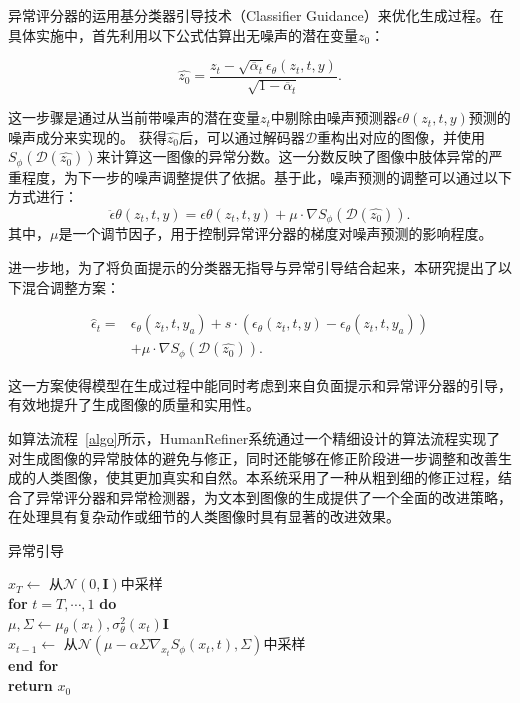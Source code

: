 异常评分器的运用基分类器引导技术（Classifier Guidance）\cite{dhariwal2021diffusion}来优化生成过程。在具体实施中，首先利用以下公式估算出无噪声的潜在变量$z_0$：

\begin{equation}
\hat{z_0} = \frac{z_t - \sqrt{\overline{\alpha}_t} \epsilon_\theta(z_t, t, y)}{\sqrt{1 - \overline{\alpha}_t}}.
\end{equation}

这一步骤是通过从当前带噪声的潜在变量$z_t$中剔除由噪声预测器$\epsilon\theta(z_t, t, y)$预测的噪声成分来实现的。
获得$\hat{z_0}$后，可以通过解码器$\mathcal{D}$重构出对应的图像，并使用$S_\phi(\mathcal{D}(\hat{z_0}))$来计算这一图像的异常分数。这一分数反映了图像中肢体异常的严重程度，为下一步的噪声调整提供了依据。基于此，噪声预测的调整可以通过以下方式进行：
\begin{equation}
\ddot{\epsilon}\theta (z_t, t, y) = \epsilon\theta(z_t, t, y) + \mu \cdot \nabla S_\phi(\mathcal{D}(\hat{z_0})).
\end{equation}
其中，$\mu$是一个调节因子，用于控制异常评分器的梯度对噪声预测的影响程度。


进一步地，为了将负面提示的分类器无指导与异常引导结合起来，本研究提出了以下混合调整方案：

\begin{equation}
\begin{split}
    \hat{\epsilon}_t = & \epsilon_\theta(z_t, t, y_a) + s \cdot (\epsilon_\theta(z_t, t, y) - \epsilon_\theta(z_t , t, y_a)) \\
& + \mu \cdot \nabla S_\phi(\mathcal{D}(\hat{z_0})).  
\end{split}  
\end{equation}

这一方案使得模型在生成过程中能同时考虑到来自负面提示和异常评分器的引导，有效地提升了生成图像的质量和实用性。


如算法流程~\ref{algo}所示，HumanRefiner系统通过一个精细设计的算法流程实现了对生成图像的异常肢体的避免与修正，同时还能够在修正阶段进一步调整和改善生成的人类图像，使其更加真实和自然。本系统采用了一种从粗到细的修正过程，结合了异常评分器和异常检测器，为文本到图像的生成提供了一个全面的改进策略，在处理具有复杂动作或细节的人类图像时具有显著的改进效果。



\label{algo}
\begin{algorithm}
\caption{异常引导}\label{alg:abnormal-guidance}
$x_{T} \leftarrow$ 从$\mathcal{N}(0, \mathbf{I})$中采样 \\
\textbf{for} $t=T, \cdots, 1$ \textbf{do} \\
    \Indp $\mu, \Sigma \leftarrow \mu_{\theta}(x_t), \sigma^{2}_{\theta}(x_t)\mathbf{I}$  \\
    $x_{t-1} \leftarrow$ 从$\mathcal{N}(\mu - \alpha \Sigma \nabla_{x_{t}} S_{\phi}(x_{t}, t), \Sigma)$中采样 \\
\Indm\textbf{end for} \\
\textbf{return} $x_0$
\end{algorithm}

